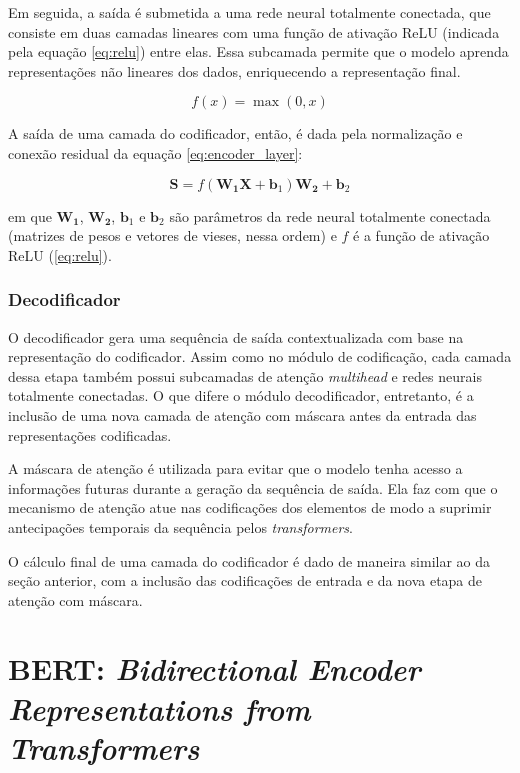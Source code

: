 Em seguida, a saída é submetida a uma rede neural totalmente conectada, que consiste em duas camadas lineares com uma função de ativação ReLU (indicada pela equação \ref{eq:relu}) entre elas. Essa subcamada permite que o modelo aprenda representações não lineares dos dados, enriquecendo a representação final.

\begin{equation}
    \label{eq:relu}
    f(x) = \max(0, x)
\end{equation}

A saída de uma camada do codificador, então, é dada pela normalização e conexão residual da equação \ref{eq:encoder_layer}:

\begin{equation}
    \label{eq:encoder_layer}
    \boldsymbol{S} = f(\boldsymbol{W_{1}} \boldsymbol{X} + \boldsymbol{b}_{1})\boldsymbol{W_{2}} + \boldsymbol{b}_{2}
\end{equation}

em que $\boldsymbol{W_{1}}$, $\boldsymbol{W_{2}}$, $\boldsymbol{b}_{1}$ e $\boldsymbol{b}_{2}$ são parâmetros da rede neural totalmente conectada (matrizes de pesos e vetores de vieses, nessa ordem) e $f$ é a função de ativação ReLU (\ref{eq:relu}).

\subsubsection{Decodificador}

O decodificador gera uma sequência de saída contextualizada com base na representação do codificador. Assim como no módulo de codificação, cada camada dessa etapa também possui subcamadas de atenção \textit{multihead} e redes neurais totalmente conectadas. O que difere o módulo decodificador, entretanto, é a inclusão de uma nova camada de atenção com máscara antes da entrada das representações codificadas.

A máscara de atenção é utilizada para evitar que o modelo tenha acesso a informações futuras durante a geração da sequência de saída. Ela faz com que o mecanismo de atenção atue nas codificações dos elementos de modo a suprimir antecipações temporais da sequência pelos \textit{transformers}.

O cálculo final de uma camada do codificador é dado de maneira similar ao da seção anterior, com a inclusão das codificações de entrada e da nova etapa de atenção com máscara.

\section{BERT: \textit{Bidirectional Encoder Representations from Transformers}}

